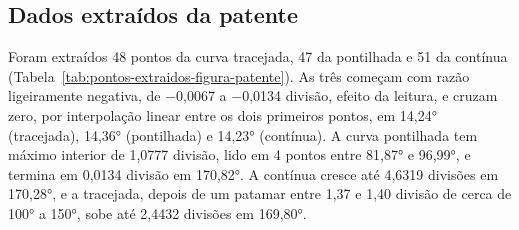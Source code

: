 \subsection{Dados extraídos da patente}\label{sec:4.2.2}

Foram extraídos 48 pontos da curva tracejada, 47 da pontilhada e 51 da contínua (Tabela~\ref{tab:pontos-extraidos-figura-patente}). As três começam com razão ligeiramente negativa, de −0,0067 a −0,0134 divisão, efeito da leitura, e cruzam zero, por interpolação linear entre os dois primeiros pontos, em 14,24° (tracejada), 14,36° (pontilhada) e 14,23° (contínua). A curva pontilhada tem máximo interior de 1,0777 divisão, lido em 4 pontos entre 81,87° e 96,99°, e termina em 0,0134 divisão em 170,82°. A contínua cresce até 4,6319 divisões em 170,28°, e a tracejada, depois de um patamar entre 1,37 e 1,40 divisão de cerca de 100° a 150°, sobe até 2,4432 divisões em 169,80°.

